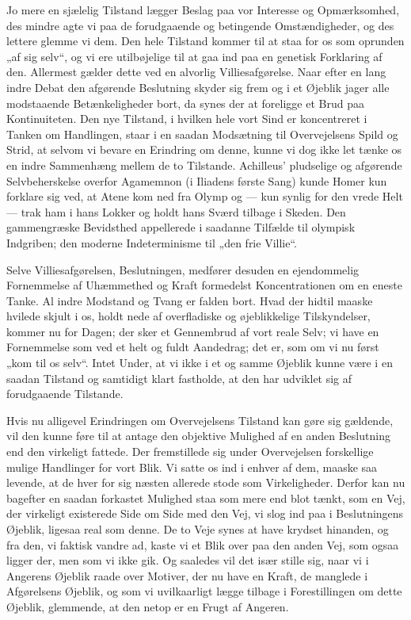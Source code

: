 \documentclass[12pt,a4paper]{book}
\newcommand{\apage}[1]{\marginnote{\footnotesize\textit{[#1]}}}
\begin{document}
Jo mere en sjælelig Tilstand lægger Beslag paa vor Interesse og Opmærksomhed, des
mindre agte vi paa de forudgaaende og betingende Omstændigheder, og des lettere glemme
vi dem. Den hele Tilstand kommer til at staa for os som oprunden „af sig selv“, og vi
ere utilbøjelige til at gaa ind paa en genetisk Forklaring af den. Allermest gælder
dette ved en alvorlig Villiesafgørelse. Naar efter en lang indre Debat den afgørende
Beslutning skyder sig frem og i et Øjeblik jager alle modstaaende Betænkeligheder
bort, da synes der at foreligge et Brud paa Kontinuiteten. Den nye Tilstand, i hvilken
hele vort Sind er koncentreret i Tanken om Handlingen, staar i en saadan Modsætning
til Overvejelsens Spild og Strid, at selvom vi bevare en Erindring om denne, kunne vi
dog ikke let tænke os en indre Sammenhæng \apage{294} mellem de to Tilstande. Achilleus'
pludselige og afgørende Selvbeherskelse overfor Agamemnon (i Iliadens første Sang)
kunde Homer kun forklare sig ved, at Atene kom ned fra Olymp og --- kun synlig for den
vrede Helt --- trak ham i hans Lokker og holdt hans Sværd tilbage i Skeden. Den
gammengræske Bevidsthed appellerede i saadanne Tilfælde til olympisk Indgriben; den
moderne Indeterminisme til „den frie Villie“.

Selve Villiesafgørelsen, Beslutningen, medfører desuden en ejendommelig Fornemmelse af
Uhæmmethed og Kraft formedelst Koncentrationen om en eneste Tanke. Al indre Modstand
og Tvang er falden bort. Hvad der hidtil maaske hvilede skjult i os, holdt nede af
overfladiske og øjeblikkelige Tilskyndelser, kommer nu for Dagen; der sker et
Gennembrud af vort reale Selv; vi have en Fornemmelse som ved et helt og fuldt
Aandedrag; det er, som om vi nu først „kom til os selv“. Intet Under, at vi ikke i et
og samme Øjeblik kunne være i en saadan Tilstand og samtidigt klart fastholde, at den
har udviklet sig af forudgaaende Tilstande.

Hvis nu alligevel Erindringen om Overvejelsens Tilstand kan gøre sig gældende, vil den
kunne føre til at antage den objektive Mulighed af en anden Beslutning end den
virkeligt fattede. Der fremstillede sig under Overvejelsen forskellige mulige
Handlinger for vort Blik. Vi satte os ind i enhver af dem, maaske saa levende, at de
hver for sig næsten allerede stode som Virkeligheder. Derfor kan nu bagefter en saadan forkastet
Mulighed staa som mere end blot tænkt, som en Vej, der virkeligt existerede Side om
Side med den Vej, vi slog ind paa i Beslutningens Øjeblik, ligesaa real som denne. De
to Veje synes at have krydset hinanden, og fra den, vi faktisk vandre ad, kaste vi et
Blik over paa den anden Vej, som ogsaa ligger der, men som vi ikke gik. Og saaledes
vil det især stille sig, naar vi i Angerens Øjeblik raade over Motiver, der nu have en
Kraft, de manglede i Afgørelsens Øjeblik, og som vi uvilkaarligt lægge tilbage i
Forestillingen om dette Øjeblik, glemmende, at den netop er en Frugt af Angeren.
\end{document}
